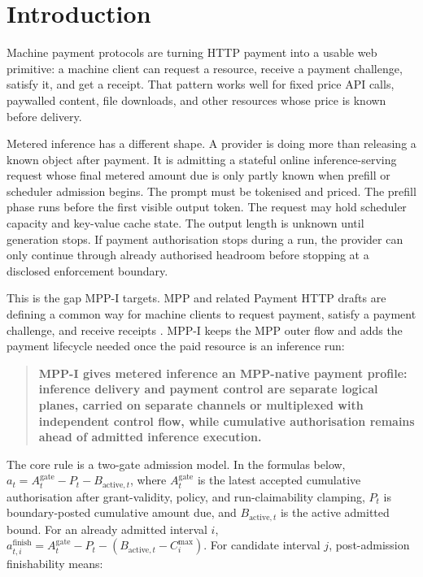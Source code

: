 \documentclass[11pt]{article}
\newcommand{\mppi}{MPP-I}
\begin{document}
\tableofcontents
\newpage

\section{Introduction}

Machine payment protocols are turning HTTP payment into a usable web primitive: a machine client can request a resource, receive a payment challenge, satisfy it, and get a receipt. That pattern works well for fixed price API calls, paywalled content, file downloads, and other resources whose price is known before delivery.

Metered inference has a different shape. A provider is doing more than releasing a known object after payment. It is admitting a stateful online inference-serving request whose final metered amount due is only partly known when prefill or scheduler admission begins. The prompt must be tokenised and priced. The prefill phase runs before the first visible output token. The request may hold scheduler capacity and key-value cache state. The output length is unknown until generation stops. If payment authorisation stops during a run, the provider can only continue through already authorised headroom before stopping at a disclosed enforcement boundary.

This is the gap \mppi{} targets. MPP and related Payment HTTP drafts are defining a common way for machine clients to request payment, satisfy a payment challenge, and receive receipts \cite{mpp}. \mppi{} keeps the MPP outer flow and adds the payment lifecycle needed once the paid resource is an inference run:

\begin{quote}
\small\raggedright\textbf{\mppi{} gives metered inference an MPP-native payment profile: inference delivery and payment control are separate logical planes, carried on separate channels or multiplexed with independent control flow, while cumulative authorisation remains ahead of admitted inference execution.}
\end{quote}

The core rule is a two-gate admission model. In the formulas below, \(a_t=A_t^{\mathrm{gate}}-P_t-B_{\mathrm{active},t}\), where \(A_t^{\mathrm{gate}}\) is the latest accepted cumulative authorisation after grant-validity, policy, and run-claimability clamping, \(P_t\) is boundary-posted cumulative amount due, and \(B_{\mathrm{active},t}\) is the active admitted bound. For an already admitted interval \(i\), \(a_{t,i}^{\mathrm{finish}}=A_t^{\mathrm{gate}}-P_t-(B_{\mathrm{active},t}-C_i^{\max})\). For candidate interval \(j\), post-admission finishability means:
\end{document}
